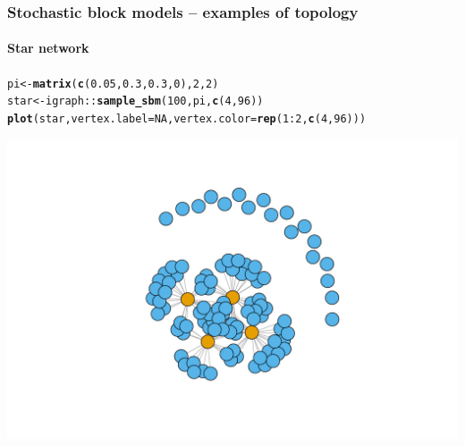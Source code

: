 \documentclass{beamer}\usepackage[]{graphicx}\usepackage[]{color}
\makeatletter
\newcommand{\hlnum}[1]{\textcolor[rgb]{0.686,0.059,0.569}{#1}}%
\newcommand{\hlopt}[1]{\textcolor[rgb]{0,0,0}{#1}}%
\newcommand{\hlstd}[1]{\textcolor[rgb]{0.345,0.345,0.345}{#1}}%
\newcommand{\hlkwb}[1]{\textcolor[rgb]{0.69,0.353,0.396}{#1}}%
\newcommand{\hlkwc}[1]{\textcolor[rgb]{0.333,0.667,0.333}{#1}}%
\newcommand{\hlkwd}[1]{\textcolor[rgb]{0.737,0.353,0.396}{\textbf{#1}}}%
\newenvironment{kframe}{%
 \def\at@end@of@kframe{}%
 \ifinner\ifhmode%
  \def\at@end@of@kframe{\end{minipage}}%
  \begin{minipage}{\columnwidth}%
 \fi\fi%
 \def\FrameCommand##1{\hskip\@totalleftmargin \hskip-\fboxsep
 \colorbox{shadecolor}{##1}\hskip-\fboxsep
     \hskip-\linewidth \hskip-\@totalleftmargin \hskip\columnwidth}%
 \MakeFramed {\advance\hsize-\width
   \@totalleftmargin\z@ \linewidth\hsize
   \@setminipage}}%
 {\par\unskip\endMakeFramed%
 \at@end@of@kframe}
\newenvironment{knitrout}{}{} %
\makeatother
\begin{document}
\begin{frame}[fragile]
  \frametitle{Stochastic block models -- examples of topology}
  \framesubtitle{Star network}

\begin{knitrout}\scriptsize
{}\color{fgcolor}\begin{kframe}
\begin{alltt}
\hlstd{pi} \hlkwb{<-} \hlkwd{matrix}\hlstd{(}\hlkwd{c}\hlstd{(}\hlnum{0.05}\hlstd{,}\hlnum{0.3}\hlstd{,}\hlnum{0.3}\hlstd{,}\hlnum{0}\hlstd{),}\hlnum{2}\hlstd{,}\hlnum{2}\hlstd{)}
\hlstd{star} \hlkwb{<-} \hlstd{igraph}\hlopt{::}\hlkwd{sample_sbm}\hlstd{(}\hlnum{100}\hlstd{, pi,} \hlkwd{c}\hlstd{(}\hlnum{4}\hlstd{,} \hlnum{96}\hlstd{))}
\hlkwd{plot}\hlstd{(star,} \hlkwc{vertex.label}\hlstd{=}\hlnum{NA}\hlstd{,} \hlkwc{vertex.color} \hlstd{=} \hlkwd{rep}\hlstd{(}\hlnum{1}\hlopt{:}\hlnum{2}\hlstd{,}\hlkwd{c}\hlstd{(}\hlnum{4}\hlstd{,}\hlnum{96}\hlstd{)))}
\end{alltt}
\end{kframe}
\includegraphics[width=.8\textwidth]{figures/unnamed-chunk-8-1} 

\end{knitrout}

\end{frame}

% 
% 
% 
% 
% 
\end{document}
